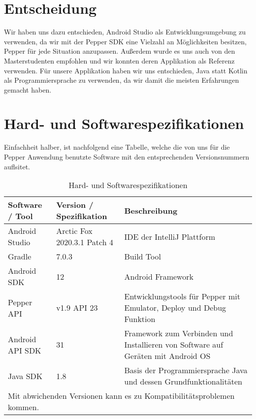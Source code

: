 \section{Entscheidung}

Wir haben uns dazu entschieden, Android Studio als Entwicklungsumgebung zu verwenden, da wir mit der Pepper SDK eine Vielzahl an 
Möglichkeiten besitzen, Pepper für jede Situation anzupassen. Außerdem wurde es uns auch von den Masterstudenten empfohlen und wir konnten 
deren Applikation als Referenz verwenden. Für unsere Applikation haben wir uns entschieden, Java statt Kotlin als Programmiersprache zu 
verwenden, da wir damit die meisten Erfahrungen gemacht haben.\\ 

\section{Hard- und Softwarespezifikationen}
Einfachheit halber, ist nachfolgend eine Tabelle, welche die von uns für die Pepper Anwendung benutzte Software mit den
entsprechenden Versionsnummern auflsitet.

\begin{table}[H]
    \caption{Hard- und Softwarespezifikationen}
    \label{table}
    \setlength{\tabcolsep}{3pt}
    \begin{tabular}{|p{100pt}|p{120pt}|p{180pt}|}
        \hline
        Software / Tool & Version / Spezifikation     & Beschreibung                                                                     \\
        \hline\hline
        Android Studio  & Arctic Fox 2020.3.1 Patch 4 & IDE der IntelliJ Plattform                                                       \\
        \hline
        Gradle          & 7.0.3                       & Build Tool                                                                       \\
        \hline
        Android SDK     & 12                          & Android Framework                                                                \\
        \hline
        Pepper API      & v1.9  API 23                & Entwicklungstools für Pepper mit Emulator, Deploy und Debug Funktion             \\
        \hline
        Android API SDK & 31                          & Framework zum Verbinden und Installieren von Software auf Geräten mit Android OS \\
        \hline
        Java SDK        & 1.8                         & Basis der Programmiersprache Java und dessen Grundfunktionalitäten               \\
        \hline
        \multicolumn{3}{p{380pt}}{Mit abwichenden Versionen kann es zu Kompatibilitätsproblemen kommen.}
    \end{tabular}
    \label{tab1}
\end{table} 

